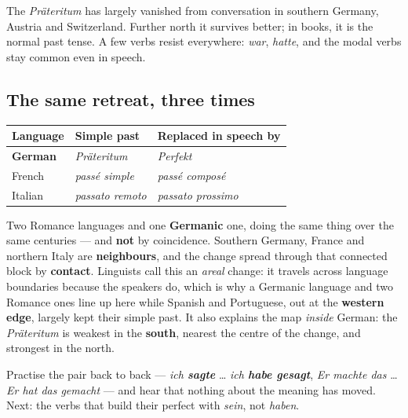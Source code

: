 The \emph{Pr\"{a}teritum} has largely vanished from conversation in southern
Germany, Austria and Switzerland. Further north it survives better; in books,
it is the normal past tense. A few verbs resist everywhere: \emph{war},
\emph{hatte}, and the modal verbs stay common even in speech.

\subsection*{The same retreat, three times}

\begin{center}
\begin{tabular}{@{}lll@{}}
\toprule
Language & Simple past & Replaced in speech by \\
\midrule
\textbf{German} & \emph{Pr\"{a}teritum} & \emph{Perfekt} \\
French & \emph{pass\'{e} simple} & \emph{pass\'{e} compos\'{e}} \\
Italian & \emph{passato remoto} & \emph{passato prossimo} \\
\bottomrule
\end{tabular}
\end{center}

\begin{culture}
Two Romance languages and one \textbf{Germanic} one, doing the same thing over
the same centuries --- and \textbf{not} by coincidence. Southern Germany, France
and northern Italy are \textbf{neighbours}, and the change spread through that
connected block by \textbf{contact}. Linguists call this an \emph{areal} change:
it travels across language boundaries because the speakers do, which is why a
Germanic language and two Romance ones line up here while Spanish and
Portuguese, out at the \textbf{western edge}, largely kept their simple past.
It also explains the map \emph{inside} German: the \emph{Pr\"{a}teritum} is
weakest in the \textbf{south}, nearest the centre of the change, and strongest
in the north.
\end{culture}

Practise the pair back to back --- \emph{ich \textbf{sagte}} \ldots{} \emph{ich
\textbf{habe gesagt}}, \emph{Er machte das} \ldots{} \emph{Er hat das gemacht}
--- and hear that nothing about the meaning has moved. Next: the verbs that
build their perfect with \emph{sein}, not \emph{haben}.
